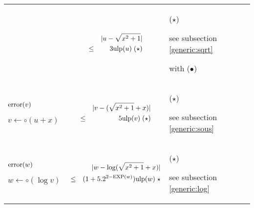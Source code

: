 \documentclass[12pt]{amsart}
\def\ulp{{\rm ulp}}
\def\Exp{{\rm EXP}}
\begin{document}
\begin{center}
\begin{tabular}{l l l}
\begin{minipage}{2.5cm}
\end{minipage} &
\begin{minipage}{7.5cm}

\begin{eqnarray}\nonumber
  &&|u-\sqrt{x^2+1}| \\\nonumber
  &       \leq& 3 \ulp(u) \;(\star)
\end{eqnarray}


\end{minipage} &
\begin{minipage}{6cm}

($\star$)

see subsection \ref{generic:sqrt}

with ($\bullet$)

\end{minipage}\\%
\begin{minipage}{2.5cm}
${\textnormal{error}}(v)$


$v \leftarrow \circ(u+x) $


\end{minipage} &
\begin{minipage}{7.5cm}

\begin{eqnarray}\nonumber
  &&|v-(\sqrt{x^2+1}+x)| \\\nonumber
  &       \leq& 5 \ulp(v) \;(\star)
\end{eqnarray}


\end{minipage} &
\begin{minipage}{6cm}

($\star$)

see subsection \ref{generic:sous}

\end{minipage}\\%
\begin{minipage}{2.5cm}
${\textnormal{error}}(w)$


$w \leftarrow \circ(\log v) $
\end{minipage} &
\begin{minipage}{7.5cm}

\begin{eqnarray}\nonumber
  &&|w-\log(\sqrt{x^2+1}+x)| \\\nonumber
  &       \leq& (1+5.2^{2-\Exp(w)}) \ulp(w) \;\star
\end{eqnarray}


\end{minipage} &
\begin{minipage}{6cm}

($\star$)

see subsection \ref{generic:log}

\end{minipage}
\end{tabular}
\end{center}
\end{document}
